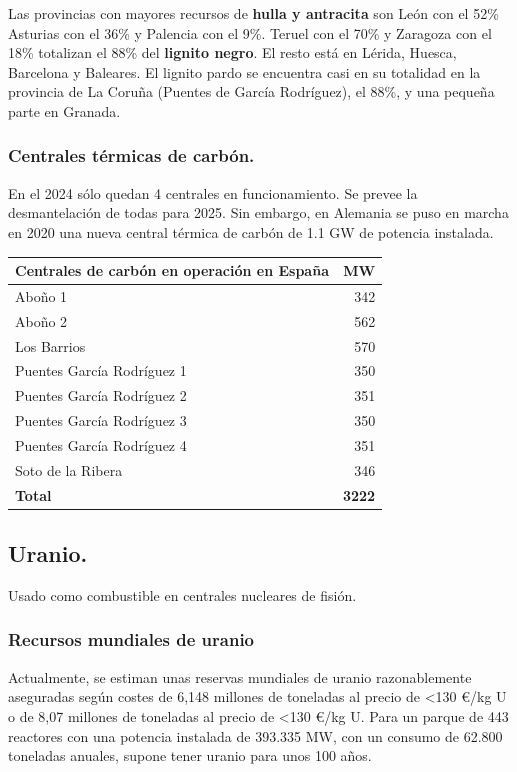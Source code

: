 			
			Las provincias con mayores recursos de \textbf{hulla y antracita} son León con el 52\% Asturias con el 36\% y Palencia con el 9\%. Teruel con el 70\% y Zaragoza con el 18\% totalizan el 88\% del \textbf{lignito negro}. El resto está en Lérida, Huesca, Barcelona y Baleares. El lignito pardo se encuentra casi en su totalidad en la provincia de La Coruña (Puentes de García Rodríguez), el 88\%, y una pequeña parte en Granada.
			
		\subsubsection{Centrales térmicas de carbón.}
			En el 2024 sólo quedan 4 centrales en funcionamiento. Se prevee la desmantelación de todas para 2025. Sin embargo, en Alemania se puso en marcha en 2020 una nueva central térmica de carbón de 1.1 GW de potencia instalada.
			
			\begin{table}[H]
				\renewcommand{\arraystretch}{1.1}
				\centering
				\begin{tabular}{lr}
					\hline
					\textbf{Centrales de carbón en operación en España} & \textbf{MW}\\
					\hline
					Aboño 1 & 342\\
					Aboño 2 & 562\\
					Los Barrios & 570\\
					Puentes García Rodríguez 1 & 350\\
					Puentes García Rodríguez 2 & 351\\
					Puentes García Rodríguez 3 & 350\\
					Puentes García Rodríguez 4 & 351\\
					Soto de la Ribera & 346\\
					\hline
					\textbf{Total} & \textbf{3222}\\
					\hline
				\end{tabular}
			\end{table}
			
	\subsection{Uranio.}
		Usado como combustible en centrales nucleares de fisión.
		
		\subsubsection{Recursos mundiales de uranio}
			Actualmente, se estiman unas reservas mundiales de uranio razonablemente aseguradas según costes de 6,148 millones de toneladas al precio de <130 €/kg U o de 8,07 millones de toneladas al precio de <130 €/kg U. Para un parque de 443 reactores con una potencia instalada de 393.335 MW, con un consumo de
			62.800 toneladas anuales, supone tener uranio para unos 100 años.
			
